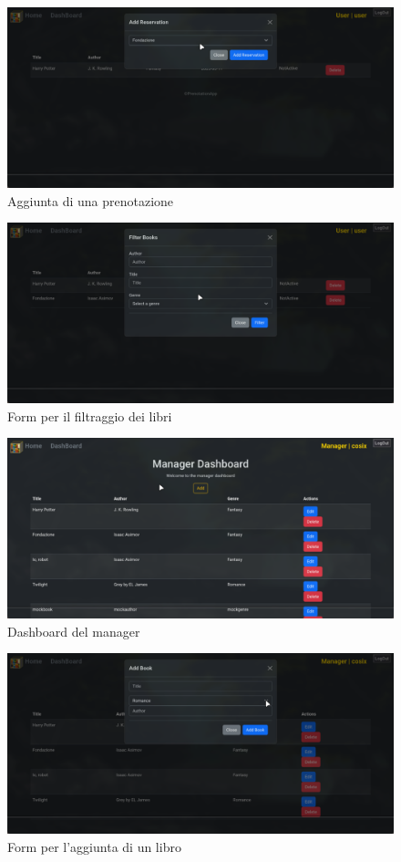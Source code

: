 \documentclass[twoside,openright,titlepage,fleqn,headinclude,12pt,a4paper,BCOR=5mm,footinclude]{scrbook}
\begin{document}
\begin{figure}[H]
  \centering
  \includegraphics[width=0.9\linewidth]{images/AddReservation.png}
  \caption{Aggiunta di una prenotazione}
  \label{fig:Aggiunta di una prenotazione}
\end{figure}
\begin{figure}[H]
  \centering
  \includegraphics[width=0.9\linewidth]{images/FilterBook.png}
  \caption{Form per il filtraggio dei libri}
  \label{fig:Form per il filtraggio dei libri}
\end{figure}
\begin{figure}[H]
  \centering
  \includegraphics[width=0.9\linewidth]{images/ManagerDashboard.png}
  \caption{Dashboard del manager}
  \label{fig:Dashboard del manager}
\end{figure}
\begin{figure}[H]
  \centering
  \includegraphics[width=0.9\linewidth]{images/AddBook.png}
  \caption{Form per l'aggiunta di un libro}
  \label{fig:Form per l'aggiunta di un libro}
\end{figure}
\end{document}
